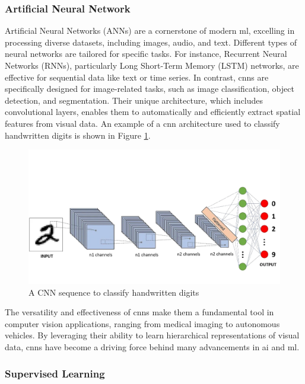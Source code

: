 \subsubsection*{Artificial Neural Network}
\label{subsubsec:artificial-neural-network}

Artificial Neural Networks (ANNs) are a cornerstone of modern \gls{ml}, excelling in processing diverse datasets, including images, audio, and text. Different types of neural networks are tailored for specific tasks. For instance, Recurrent Neural Networks (RNNs), particularly Long Short-Term Memory (LSTM) networks, are effective for sequential data like text or time series. In contrast, \glspl{cnn} are specifically designed for image-related tasks, such as image classification, object detection, and segmentation. Their unique architecture, which includes convolutional layers, enables them to automatically and efficiently extract spatial features from visual data. An example of a \gls{cnn} architecture used to classify handwritten digits is shown in Figure \ref{fig:convolutional-neural-network}. \cite{geeksforgeeks:cnn} \\

\begin{figure}[h!]
    \centering
    \includegraphics[width=0.75\linewidth]{figures/theory/convolutional-neural-network.png}
    \caption[A CNN sequence to classify handwritten digits]{A CNN sequence to classify handwritten digits \cite{medium:cnn}}
    \label{fig:convolutional-neural-network}
\end{figure}

The versatility and effectiveness of \glspl{cnn} make them a fundamental tool in computer vision applications, ranging from medical imaging to autonomous vehicles. By leveraging their ability to learn hierarchical representations of visual data, \glspl{cnn} have become a driving force behind many advancements in \gls{ai} and \gls{ml}.

\subsubsection*{Supervised Learning}
\label{subsubsec:supervised-learning}


